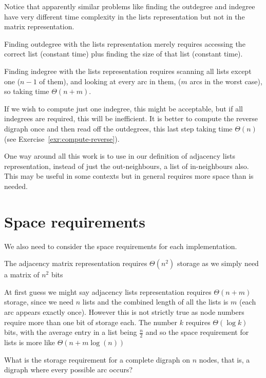 Notice that apparently similar problems like finding the outdegree and indegree have very different time complexity in the lists representation but not in the matrix representation. 

Finding outdegree with the lists representation merely requires accessing
the correct list (constant time) plus finding the size of  that list
(constant time). 

Finding indegree with the  lists representation requires
scanning all lists except one ($n-1$ of them), and looking at every arc in
them, ($m$ arcs in the worst case), so taking time $\Theta(n+m)$. 


If we wish to compute just one indegree, this might be acceptable, but if all indegrees are required,
this will be inefficient. It is better to compute the reverse digraph once
and then read off the outdegrees, this last step taking time $\Theta(n)$ 
(see Exercise~\ref{exr:compute-reverse}).

One way around all this work is to use in
our definition of adjacency lists representation, instead of just the
out-neighbours, a list of in-neighbours also. This may be useful in some
contexts but in general requires more space than is needed.



\section{Space requirements}

We also need to consider the space requirements for each implementation. 

The adjacency matrix
representation requires $\Theta(n^2)$ storage as we simply need a matrix of $n^2$
bits 

At first guess we might say adjacency lists representation requires
$\Theta(n+m)$ storage, since we need $n$ lists and the combined length of all the lists is $m$ (each arc appears exactly once).
However this is not strictly true as node numbers require more than one bit of storage each. The number $k$ requires  $\Theta(\log k)$ bits, with the average entry in a list being $\frac n 2$ and  so the space requirement for lists is more like $\Theta(n+m \log(n))$ 


\begin{Boxample}[2]
What is the storage requirement for a complete digraph on $n$ nodes, that is, a digraph where every possible arc
occurs?
\end{Boxample}


